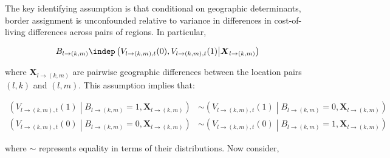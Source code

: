 The key identifying assumption is that conditional on geographic determinants, border assignment is unconfounded relative to variance in differences in cost-of-living differences across pairs of regions. In particular, 
\begin{linenomath*}
    \begin{equation*} 
        B_{l \rightarrow (k,m)} \indep  \left( V_{l \rightarrow (k,m),t}(0),V_{l \rightarrow (k,m),t}(1) \middle\vert \boldsymbol{X}_{l \rightarrow (k,m)}\right)
    \end{equation*}
\end{linenomath*}
where $\boldsymbol{X}_{l \rightarrow (k,m)}$ are pairwise geographic differences between the location pairs $(l,k)$ and $(l,m)$. This assumption implies that: 
\begin{linenomath*}
    \begin{equation*}
        \begin{aligned}
            \left(V_{l \rightarrow (k,m),t}(1) \middle\vert B_{l \rightarrow (k,m)} = 1, \boldsymbol{X}_{l \rightarrow (k,m)} \right) 
                & \sim \left(V_{l \rightarrow (k,m),t}(1) \middle\vert B_{l \rightarrow (k,m)} = 0, \boldsymbol{X}_{l \rightarrow (k,m)} \right) \\
            \left(V_{l \rightarrow (k,m),t}(0) \middle\vert B_{l \rightarrow (k,m)} = 0, \boldsymbol{X}_{l \rightarrow (k,m)} \right) 
                & \sim \left(V_{l \rightarrow (k,m),t}(0) \middle\vert B_{l \rightarrow (k,m)} = 1, \boldsymbol{X}_{l \rightarrow (k,m)} \right) 
        \end{aligned}
    \end{equation*}
\end{linenomath*}
where $\sim$ represents equality in terms of their distributions. Now consider,
